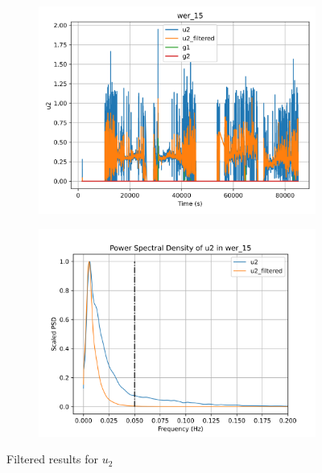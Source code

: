 \begin{figure}[H]

\begin{minipage}{0.49\textwidth}
        \begin{figure}[H]
                \centering
                \includegraphics[width = \textwidth]{./figs/trk_filt/wer_15/u2.png}
        \end{figure}
\end{minipage}
\begin{minipage}{0.49\textwidth}
        \begin{figure}[H]
                \centering
                \includegraphics[width = \textwidth]{./figs/trk_filt/wer_15/u2_psd.png}
        \end{figure}
\end{minipage}
\caption{Filtered results for $u_2$}

\end{figure}


